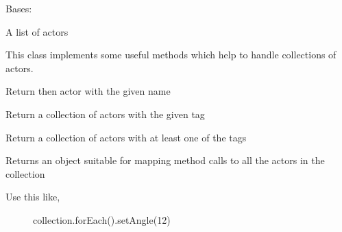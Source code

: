 \documentclass[letterpaper,10pt,english]{sphinxmanual}
\begin{document}
\begin{fulllineitems}
\label{actor:serge.actor.ActorCollection}
Bases: 

A list of actors

This class implements some useful methods which help to 
handle collections of actors.

\begin{fulllineitems}
\label{actor:serge.actor.ActorCollection.findActorByName}
Return then actor with the given name

\end{fulllineitems}


\begin{fulllineitems}
\label{actor:serge.actor.ActorCollection.findActorsByTag}
Return a collection of actors with the given tag

\end{fulllineitems}


\begin{fulllineitems}
\label{actor:serge.actor.ActorCollection.findActorsByTags}
Return a collection of actors with at least one of the tags

\end{fulllineitems}


\begin{fulllineitems}
\label{actor:serge.actor.ActorCollection.forEach}
Returns an object suitable for mapping method calls to all the actors in the collection
\begin{description}
\item[{Use this like,}] \leavevmode
collection.forEach().setAngle(12)

\end{description}

\end{fulllineitems}


\end{fulllineitems}
\end{document}
